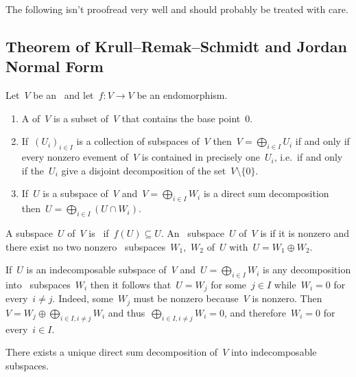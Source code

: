 \documentclass[a4paper, 11pt, twoside=semi]{scrartcl}
\begin{document}
The following isn’t proofread very well and should probably be treated with care.



\subsection{Theorem of Krull--Remak--Schmidt and Jordan Normal Form}
\label{jordan normal form}

Let~$V$ be an~ and let~$f \colon V \to V$ be an endomorphism.

\begin{recall}
  \leavevmode
  \begin{enumerate}
    \item
      A  of~$V$ is a subset of~$V$ that contains the base point~$0$.
    \item
      If~$(U_i)_{i \in I}$ is a collection of subspaces of~$V$ then~$V = \bigoplus_{i \in I} U_i$ if and only if every nonzero evement of~$V$ is contained in precisely one~$U_i$, i.e.\ if and only if the~$U_i$ give a disjoint decomposition of the set~$V \setminus \{ 0 \}$.
    \item
      If~$U$ is a subspace of~$V$ and~$V = \bigoplus_{i \in I} W_i$ is a direct sum decomposition then~$U = \bigoplus_{i \in I} (U \cap W_i)$.
  \end{enumerate}
\end{recall}

\begin{definition}
  A subspace~$U$ of~$V$ is~ if~$f(U) \subseteq U$.
  An~ subspace~$U$ of~$V$ is  if it is nonzero and there exist no two nonzero~ subspaces~$W_1$,~$W_2$ of~$U$ with~$U = W_1 \oplus W_2$.
\end{definition}

\begin{remark}
  If~$U$ is an indecomposable subspace of~$V$ and~$U = \bigoplus_{i \in I} W_i$ is any decomposition into~ subspaces~$W_i$ then it follows that~$U = W_j$ for some~$j \in I$ while~$W_i = 0$ for every~$i \neq j$.
  Indeed, some~$W_j$ must be nonzero because~$V$ is nonzero.
  Then~$V = W_j \oplus \bigoplus_{i \in I, i \neq j} W_i$ and thus~$\bigoplus_{i \in I, i \neq j} W_i = 0$, and therefore~$W_i = 0$ for every~$i \in I$.
\end{remark}

\begin{proposition}
  There exists a unique direct sum decomposition of~$V$ into indecomposable~ subspaces.
\end{proposition}
\end{document}
